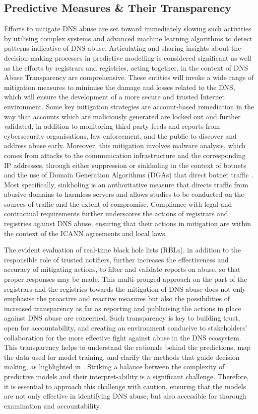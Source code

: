 \subsection{Predictive Measures \& Their Transparency}

Efforts to mitigate DNS abuse are set toward immediately slowing such activities by utilising complex systems and advanced machine learning algorithms to detect patterns indicative of DNS abuse. Articulating and sharing insights about the decision-making processes in predictive modelling is considered significant as well as the efforts by registrars and registries, acting together, in the context of DNS Abuse Transparency are comprehensive. These entities will invoke a wide range of mitigation measures to minimise the damage and losses related to the DNS, which will ensure the development of a more secure and trusted Internet environment. Some key mitigation strategies are account-based remediation in the way that accounts which are maliciously generated are locked out and further validated, in addition to monitoring third-party feeds and reports from cybersecurity organisations, law enforcement, and the public to discover and address abuse early. Moreover, this mitigation involves malware analysis, which comes from attacks to the communication infrastructure and the corresponding IP addresses, through either suppression or sinkholing in the context of botnets and the use of Domain Generation Algorithms (DGAs) that direct botnet traffic \cite{ M3AAWG2024}. Most specifically, sinkholing is an authoritative measure that directs traffic from abusive domains to harmless servers and allows studies to be conducted on the sources of traffic and the extent of compromise. Compliance with legal and contractual requirements further underscores the actions of registrars and registries against DNS abuse, ensuring that their actions in mitigation are within the context of the ICANN agreements and local laws. 

The evident evaluation of real-time black hole lists (RBLs), in addition to the responsible role of trusted notifiers, further increases the effectiveness and accuracy of mitigating actions, to filter and validate reports on abuse, so that proper responses may be made. This multi-pronged approach on the part of the registrars and the registries towards the mitigation of DNS abuse does not only emphasise the proactive and reactive measures but also the possibilities of increased transparency as far as reporting and publicising the actions in place against DNS abuse are concerned. Such transparency is key to building trust, open for accountability, and creating an environment conducive to stakeholders' collaboration for the more effective fight against abuse in the DNS ecosystem. This transparency helps to understand the rationale behind the predictions, map the data used for model training, and clarify the methods that guide decision making, as highlighted in \cite{hussain2022software}. Striking a balance between the complexity of predictive models and their interpret-ability is a significant challenge. Therefore, it is essential to approach this challenge with caution, ensuring that the models are not only effective in identifying DNS abuse, but also accessible for thorough examination and accountability.


